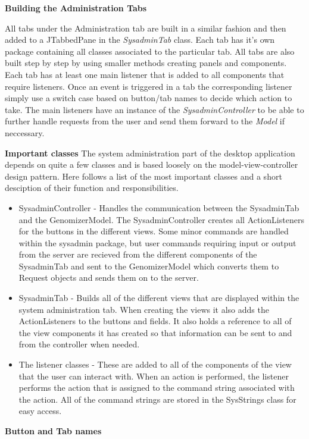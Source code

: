 \textbf{Building the Administration Tabs}


All tabs under the Administration tab are built in a similar fashion and then added to a
JTabbedPane in the \textit{SysadminTab} class. Each tab has it’s own package containing 
all classes associated to the particular tab. All tabs are also built step by step by 
using smaller methods creating panels and components. Each tab has at least one main 
listener that is added to all components that require listeners. Once an event is triggered 
in a tab the corresponding listener simply use a switch case based on button/tab names 
to decide which action to take. The main listeners have an instance of the \textit{SysadminController }
to be able to further handle requests from the user and send them forward to the \textit{Model} if neccessary.

\textbf{Important classes}
The system administration part of the desktop application depends on quite a few classes and is based loosely on the model-view-controller design pattern. Here follows a list of the most important classes and a short desciption of their function and responsibilities.
\begin{itemize}
\item SysadminController - Handles the communication between the SysadminTab and the GenomizerModel. The SysadminController creates all ActionListeners for the buttons in the different views. Some minor commands are handled within the sysadmin package, but user commands requiring input or output from the server are recieved from the different components of the SysadminTab and sent to the GenomizerModel which converts them to Request objects and sends them on to the server.
\item SysadminTab - Builds all of the different views that are displayed within the system administration tab. When creating the views it also adds the ActionListeners to the buttons and fields. It also holds a reference to all of the view components it has created so that information can be sent to and from the controller when needed.
\item The listener classes - These are added to all of the components of the view that the user can interact with. When an action is performed, the listener performs the action that is assigned to the command string associated with the action. All of the command strings are stored in the SysStrings class for easy access.
\end{itemize}


\textbf{Button and Tab names}


